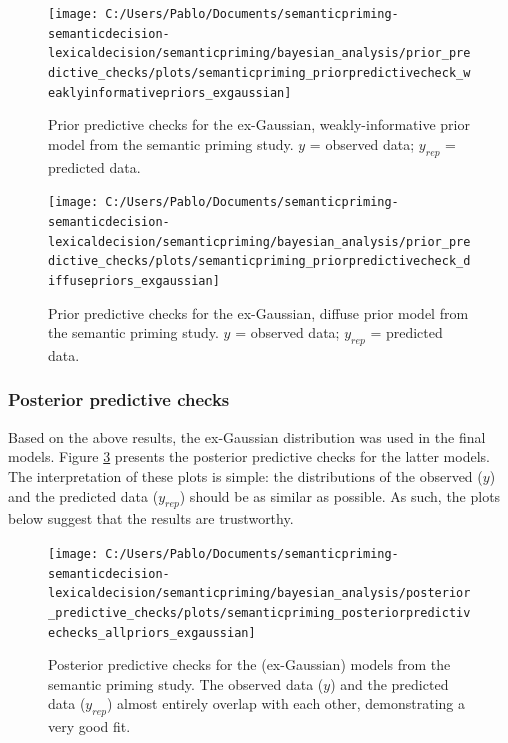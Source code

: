 \documentclass[
  12pt,
  man,floatsintext]{apa7}
\begin{document}
\begin{figure}

{\centering \texttt{[image: C:/Users/Pablo/Documents/semanticpriming-semanticdecision-lexicaldecision/semanticpriming/bayesian\_analysis/prior\_predictive\_checks/plots/semanticpriming\_priorpredictivecheck\_weaklyinformativepriors\_exgaussian]} 

}

\caption{Prior predictive checks for the ex-Gaussian, weakly-informative prior model from the semantic priming study. \(y\) = observed data; \(y_{rep}\) = predicted data.}\label{fig:semanticpriming-priorpredictivecheck-weaklyinformativepriors-exgaussian}
\end{figure}



\begin{figure}

{\centering \texttt{[image: C:/Users/Pablo/Documents/semanticpriming-semanticdecision-lexicaldecision/semanticpriming/bayesian\_analysis/prior\_predictive\_checks/plots/semanticpriming\_priorpredictivecheck\_diffusepriors\_exgaussian]} 

}

\caption{Prior predictive checks for the ex-Gaussian, diffuse prior model from the semantic priming study. \(y\) = observed data; \(y_{rep}\) = predicted data.}\label{fig:semanticpriming-priorpredictivecheck-diffusepriors-exgaussian}
\end{figure}

\hypertarget{posterior-predictive-checks}{%
\subsubsection{Posterior predictive checks}\label{posterior-predictive-checks}}

Based on the above results, the ex-Gaussian distribution was used in the final models. Figure \ref{fig:semanticpriming-posteriorpredictivechecks-allpriors-exgaussian} presents the posterior predictive checks for the latter models. The interpretation of these plots is simple: the distributions of the observed (\(y\)) and the predicted data (\(y_{rep}\)) should be as similar as possible. As such, the plots below suggest that the results are trustworthy.



\begin{figure}

{\centering \texttt{[image: C:/Users/Pablo/Documents/semanticpriming-semanticdecision-lexicaldecision/semanticpriming/bayesian\_analysis/posterior\_predictive\_checks/plots/semanticpriming\_posteriorpredictivechecks\_allpriors\_exgaussian]} 

}

\caption{Posterior predictive checks for the (ex-Gaussian) models from the semantic priming study. The observed data (\(y\)) and the predicted data (\(y_{rep}\)) almost entirely overlap with each other, demonstrating a very good fit.}\label{fig:semanticpriming-posteriorpredictivechecks-allpriors-exgaussian}
\end{figure}
\end{document}
